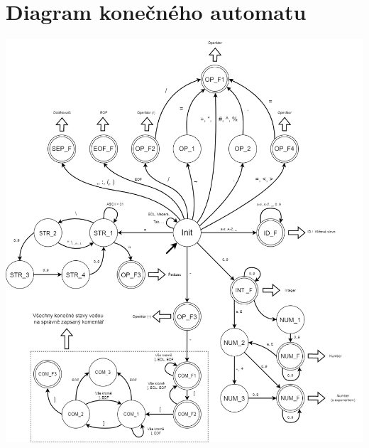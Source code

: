 \documentclass[11pt]{article}
\begin{document}
    \section{Diagram konečného automatu}
        \includegraphics[width=1\linewidth]{FSM.png}
        \pagebreak
    
\end{document}

